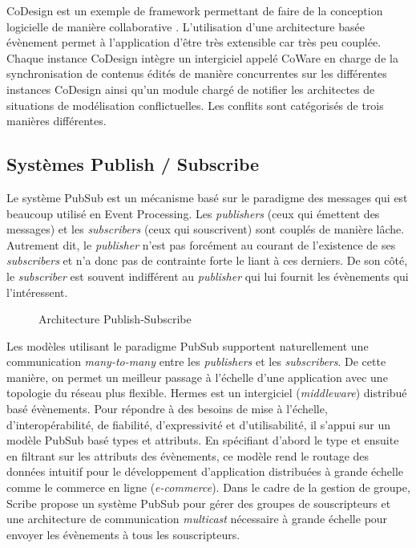 CoDesign est un exemple de \gls{framework} permettant de faire de la 
conception logicielle de manière collaborative \cite{Bang2010}. L'utilisation d'une 
architecture basée évènement permet à l'application d'être très extensible car très 
peu couplée. Chaque instance CoDesign intègre un intergiciel appelé CoWare en 
charge de la synchronisation de contenus édités de manière concurrentes sur les 
différentes instances CoDesign ainsi qu'un module chargé de notifier les 
architectes de situations de modélisation conflictuelles. Les conflits sont 
catégorisés de trois manières différentes. 
	
	\subsection{Systèmes Publish / Subscribe}

Le système \acrlong{PubSub} est un mécanisme basé sur le paradigme des 
messages qui est beaucoup utilisé en Event Processing. 
Les \textit{publishers} (ceux qui émettent des messages) et les \textit{subscribers} 
(ceux qui souscrivent) sont couplés de manière lâche. 
Autrement dit, le \textit{publisher} n'est pas forcément au courant de l'existence de 
ses \textit{subscribers} et n'a donc pas de contrainte forte le liant à ces derniers. 
De son côté, le \textit{subscriber} est souvent indifférent au \textit{publisher} qui lui 
fournit les évènements qui l'intéressent. 

\begin{figure}[h]
	\centering
	\caption{Architecture Publish-Subscribe}
	\label{fig:pubsub}
\end{figure}


Les modèles utilisant le paradigme 
\gls{PubSub} supportent naturellement une communication \textit{many-to-many} 
entre les \textit{publishers} et les \textit{subscribers}.  De cette manière, on permet 
un meilleur passage à l'échelle d'une application avec une topologie du réseau plus 
flexible. 
Hermes \cite{Pietzuch2002} est un intergiciel (\textit{middleware}) distribué basé 
évènements. 
Pour répondre à des besoins de mise à l'échelle, d'interopérabilité, de fiabilité, 
d'expressivité et d'utilisabilité, il s'appui sur un modèle \gls{PubSub} basé types et 
attributs. 
En spécifiant d'abord le type et ensuite en filtrant sur les attributs des 
évènements, ce modèle rend le routage des données intuitif pour le 
développement d'application distribuées à grande échelle comme le commerce en 
ligne (\textit{e-commerce}). 
Dans le cadre de la gestion de groupe, Scribe \cite{Castro2002} propose un 
système \gls{PubSub} pour gérer des groupes de souscripteurs et une architecture 
de communication \textit{multicast} nécessaire à grande échelle pour envoyer les 
évènements à tous les souscripteurs. 

